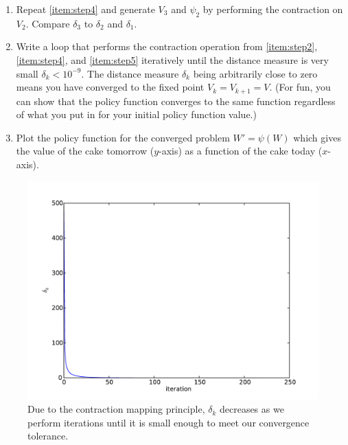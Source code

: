 \begin{problem}
\begin{enumerate}
\item \label{item:step5} Repeat \ref{item:step4} and generate $V_3$ and $\psi_2$ by performing the contraction on $V_2$. Compare $\delta_3$ to $\delta_2$ and $\delta_1$.

\item Write a loop that performs the contraction operation from \ref{item:step2}, \ref{item:step4}, and \ref{item:step5} iteratively until the distance measure is very small $\delta_k < 10^{-9}$.  The distance measure $\delta_k$ being arbitrarily close to zero means you have converged to the fixed point $V_k = V_{k+1} = V$. (For fun, you can show that the policy function converges to the same function regardless of what you put in for your initial policy function value.)

\item Plot the policy function for the converged problem $W' = \psi\left(W\right)$ which gives the value of the cake tomorrow ($y$-axis) as a function of the cake today ($x$-axis).
\end{enumerate}
\end{problem}

\begin{figure}
\includegraphics[width=\textwidth]{convergence.pdf}
\caption{Due to the contraction mapping principle, $\delta_k$ decreases as we perform iterations until it is small enough to meet our convergence tolerance.}
\end{figure}
